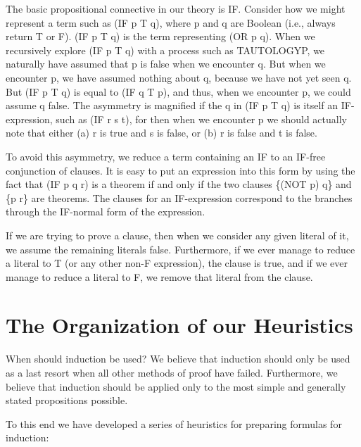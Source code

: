\documentclass[10pt]{book}
\begin{document}
The basic propositional connective in our theory is IF.  
Consider how we might represent a term such as (IF p T q),
where  p and q are Boolean (i.e., always
return T or F).
(IF p T q) is
the term representing (OR p q).  When we recursively explore (IF p T q)
with a process such as  TAUTOLOGYP, we naturally have assumed
that p is false when we encounter q.  But when we encounter p, we have assumed
nothing about q, because we have not yet seen q.  But (IF p T q)
is equal to (IF q T p), and thus, when we encounter p, we could assume
q false.  The asymmetry is magnified if the q in (IF p T q) is itself
an IF-expression, such as (IF r s t), for then when we encounter p we
should actually note that  either  (a) r is true and s is false, or
(b) r is false and t is false.

To avoid this asymmetry, we  reduce
a term containing an IF to an IF-free conjunction of clauses.
It is easy to put an expression into this form by using
the fact that (IF p q r) is a theorem if and only if the two
clauses \{(NOT p) q\} and \{p r\} are theorems.
The clauses for an IF-expression
correspond to the branches through the IF-normal form of the expression.

If we are trying to prove a clause, then when we consider any
given literal of it, we assume the remaining literals false.
Furthermore, if we ever manage to reduce a literal to T (or any other non-F
expression), the clause is true, and if we ever manage to reduce a literal
to F, we remove that literal from the clause.

\section{The Organization of our Heuristics}
When should induction be used?  We believe that induction should
only be used as a last resort when all other methods of
proof have failed.  Furthermore, we believe that
induction should be applied  only to the most simple
and generally stated propositions possible.

To this end we have developed a series of heuristics for
preparing formulas for induction:
\end{document}
